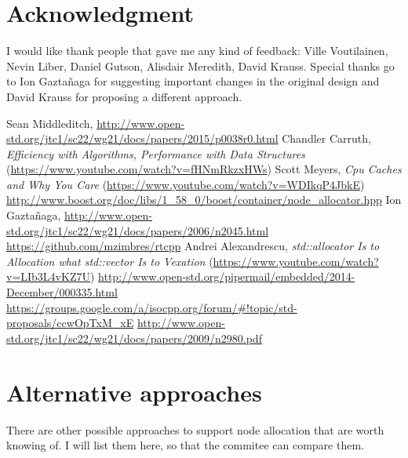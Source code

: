 \documentclass[11pt]{article}
\begin{document}

\section{Acknowledgment}

I would like thank people that gave me any kind of feedback: Ville Voutilainen,
Nevin Liber, Daniel Gutson, Alisdair Meredith, David Krauss. Special thanks go
to Ion Gaztañaga for suggesting important changes in the original design and David 
Krauss for proposing a different approach.

\begin{thebibliography}{9}

   Sean Middleditch, \url{http://www.open-std.org/jtc1/sc22/wg21/docs/papers/2015/p0038r0.html}
   Chandler Carruth, {\it Efficiency with Algorithms, Performance
  with Data Structures} (\url{https://www.youtube.com/watch?v=fHNmRkzxHWs})
   Scott Meyers, {\it Cpu Caches and Why You Care} (\url{https://www.youtube.com/watch?v=WDIkqP4JbkE})
   \url{http://www.boost.org/doc/libs/1_58_0/boost/container/node_allocator.hpp}
   Ion Gazta\~ naga, \url{http://www.open-std.org/jtc1/sc22/wg21/docs/papers/2006/n2045.html}
   \url{https://github.com/mzimbres/rtcpp}
   Andrei Alexandrescu, {\it std::allocator Is to Allocation what
  std::vector Is to Vexation} (\url{https://www.youtube.com/watch?v=LIb3L4vKZ7U})
   \url{http://www.open-std.org/pipermail/embedded/2014-December/000335.html}
   \url{https://groups.google.com/a/isocpp.org/forum/#!topic/std-proposals/ccwOpTxM_xE}
   \url{http://www.open-std.org/jtc1/sc22/wg21/docs/papers/2009/n2980.pdf}

\end{thebibliography}

\appendix

\section{Alternative approaches} \label{alternative}

There are other possible approaches to support node allocation that are worth knowing
of.  I will list them here, so that the commitee can compare them.
\end{document}
